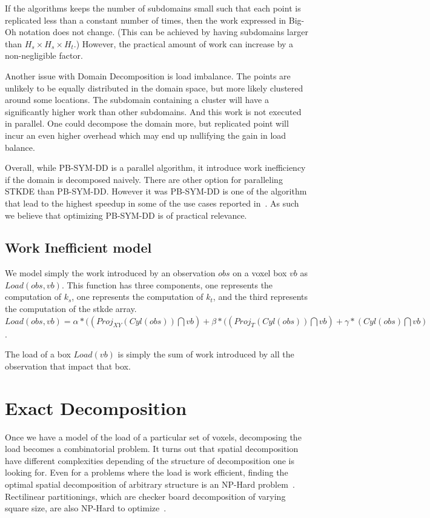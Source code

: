 \documentclass[10pt, conference, compsocconf]{IEEEtran}
\begin{document}
If the algorithms keeps the number of subdomains small such that each
point is replicated less than a constant number of times, then
the work expressed in Big-Oh notation does not change.
(This can be achieved by having subdomains larger than
$H_s \times H_s \times H_t$.) However, the practical amount of work can
increase by a non-negligible factor. 

Another issue with Domain Decomposition is load imbalance. The
points are unlikely to be equally distributed in the domain space, but
more likely clustered around some locations. The subdomain containing
a cluster will have a significantly higher work than other
subdomains. And this work is not executed in parallel. One could
decompose the domain more, but replicated point 
will incur an even higher overhead which may end up nullifying
the gain in load balance.

Overall, while PB-SYM-DD is a parallel algorithm, it introduce work
inefficiency if the domain is decomposed naively. There are other
option for paralleling STKDE than PB-SYM-DD. However it was PB-SYM-DD
is one of the algorithm that lead to the highest speedup in some of
the use cases reported in~\cite{Saule17-ICPP}. As such we believe that
optimizing PB-SYM-DD is of practical relevance.

\subsection{Work Inefficient model}

We model simply the work introduced by an observation $obs$ on a voxel
box $vb$ as $Load(obs, vb)$. This function has three components, one
represents the computation of $k_s$, one represents the computation of
$k_t$, and the third represents the computation of the stkde
array. $Load(obs, vb) = \alpha * ((Proj_{XY}(Cyl(obs)) \bigcap vb) +
\beta * ((Proj_{T}(Cyl(obs)) \bigcap vb) + \gamma * (Cyl(obs) \bigcap vb)$.

The load of a box $Load(vb)$ is simply the sum of work introduced by
all the observation that impact that box.

    
\section{Exact Decomposition}
\label{sec:exactdecomposition}

Once we have a model of the load of a particular set of voxels,
decomposing the load becomes a combinatorial problem. It turns out
that spatial decomposition have different complexities depending of
the structure of decomposition one is looking for. Even for a problems
where the load is work efficient, finding the optimal spatial
decomposition of arbitrary structure is an NP-Hard
problem~\cite{grigni96}. Rectilinear partitionings, which are checker board
decomposition of varying square size, are also NP-Hard to optimize~\cite{grigni96,aspvall98}.
\end{document}
